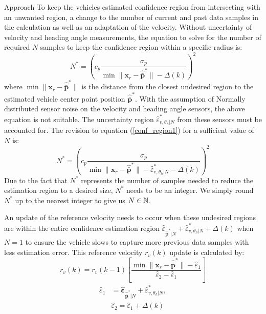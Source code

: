 \begin{section}{Approach}
To keep the vehicles estimated confidence region from intersecting with an unwanted region, a change to the number of current and past data samples in the calculation as well as an adaptation of the velocity. Without uncertainty of velocity and heading angle measurements, the equation to solve for the number of required $N$ samples to keep the confidence region within a specific radius is:
    \begin{equation}
    \label{conf_region1}
	    N^* = \left(c_p \frac{ \sigma_p }{ {\min \lVert \bm{x}_r - \hat{\bar{\bm{p}}}^* \rVert} -\Delta(k) } \right)^2
	\end{equation}
where $ \min \lVert {\bm{x}_r-\hat{\bar{\bm{p}}}^*} \rVert$ is the distance from the closest undesired region to the estimated vehicle center point position $\hat{\bar{\bm{p}}}^*$.
With the assumption of Normally distributed sensor noise on the velocity and heading angle sensors, the above equation is not suitable. The uncertainty region $\hat{\varepsilon}_{v,\theta_h|N}^{*}$ from these sensors must be accounted for. The revision to equation (\ref{conf_region1}) for a sufficient value of $N$ is:
    \begin{equation}
	    N^* = \left(c_p \frac{ \sigma_p }{ {\min \lVert \bm{x}_r - \hat{\bar{\bm{p}}}^* \rVert} -\hat{\varepsilon}_{v,\theta_h|N}^{*}-\Delta(k) } \right)^2
	\end{equation}
Due to the fact that $N^*$ represents the number of samples needed to reduce the estimation region to a desired size, $N^*$ needs to be an integer. We simply round $N^*$ up to the nearest integer to give us $N \in \mathbb{N}$.

An update of the reference velocity needs to occur when these undesired regions are within the entire confidence estimation region $ \hat{\varepsilon}_{\hat{\bar{\bm{p}}}^*|N} +\hat{\varepsilon}_{v,\theta_h|N}^{*}+\Delta(k)$ when $N=1$ to ensure the vehicle slows to capture more previous data samples with less estimation error. This reference velocity $r_v(k)$ update is calculated by:
    \begin{equation}
	    r_v(k)=r_v(k-1) \left[ \frac{ \min \lVert \bm{x}_r - \hat{\bar{\bm{p}}}^* \rVert - \hat{\varepsilon}_1}{\hat{\varepsilon}_2 - \hat{\varepsilon}_1} \right]
	\end{equation}
	\begin{equation}
	\begin{split}
	    \hat{\varepsilon}_1&=\hat{\bm{\varepsilon}}_{\hat{\bar{\bm{p}}}^*|N} +\hat{\varepsilon}_{v,\theta_h|N}^{*},\\ &\hat{\varepsilon}_2=\hat{\varepsilon}_1+\Delta(k) \nonumber	    
	\end{split}
	\end{equation}
	

\end{section}
